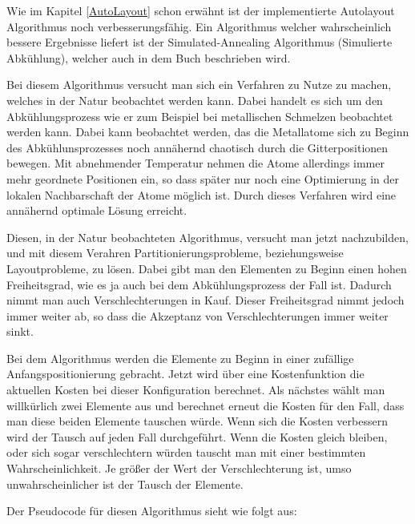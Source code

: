 Wie im Kapitel \ref{AutoLayout} schon erwähnt ist der implementierte Autolayout
Algorithmus noch verbesserungsfähig. Ein Algorithmus welcher wahrscheinlich
bessere Ergebnisse liefert ist der Simulated-Annealing Algorithmus (Simulierte
Abkühlung), welcher auch in dem Buch \cite{Layout} beschrieben
wird.\vspace{10pt}

Bei diesem Algorithmus versucht man sich ein Verfahren zu Nutze zu machen,
welches in der Natur beobachtet werden kann. Dabei handelt es sich um den
Abkühlungsprozess wie er zum Beispiel bei metallischen Schmelzen beobachtet
werden kann. Dabei kann beobachtet werden, das die Metallatome sich zu Beginn
des Abkühlunsprozesses noch annähernd chaotisch durch die Gitterpositionen
bewegen. Mit abnehmender Temperatur nehmen die Atome allerdings immer mehr
geordnete Positionen ein, so dass später nur noch eine Optimierung in der
lokalen Nachbarschaft der Atome möglich ist. Durch dieses Verfahren wird eine
annähernd optimale Lösung erreicht.\vspace{10pt}

Diesen, in der Natur beobachteten Algorithmus, versucht man jetzt nachzubilden,
und mit diesem Verahren Partitionierungsprobleme, beziehungsweise
Layoutprobleme, zu lösen. Dabei gibt man den Elementen zu Beginn einen hohen
Freiheitsgrad, wie es ja auch bei dem Abkühlungsprozess der Fall ist. Dadurch
nimmt man auch Verschlechterungen in Kauf. Dieser Freiheitsgrad nimmt jedoch
immer weiter ab, so dass die Akzeptanz von Verschlechterungen immer weiter
sinkt.\vspace{10pt}

Bei dem Algorithmus werden die Elemente zu Beginn in einer zufällige
Anfangspositionierung gebracht. Jetzt wird über eine Kostenfunktion die
aktuellen Kosten bei dieser Konfiguration berechnet. Als nächstes wählt man
willkürlich zwei Elemente aus und berechnet erneut die Kosten für den Fall,
dass man diese beiden Elemente tauschen würde. Wenn sich die Kosten verbessern
wird der Tausch auf jeden Fall durchgeführt. Wenn die Kosten gleich bleiben,
oder sich sogar verschlechtern würden tauscht man mit einer bestimmten
Wahrscheinlichkeit. Je größer der Wert der Verschlechterung ist, umso
unwahrscheinlicher ist der Tausch der Elemente.\vspace{10pt}

\noindent
Der Pseudocode für diesen Algorithmus sieht wie folgt aus:\vspace{10pt}

